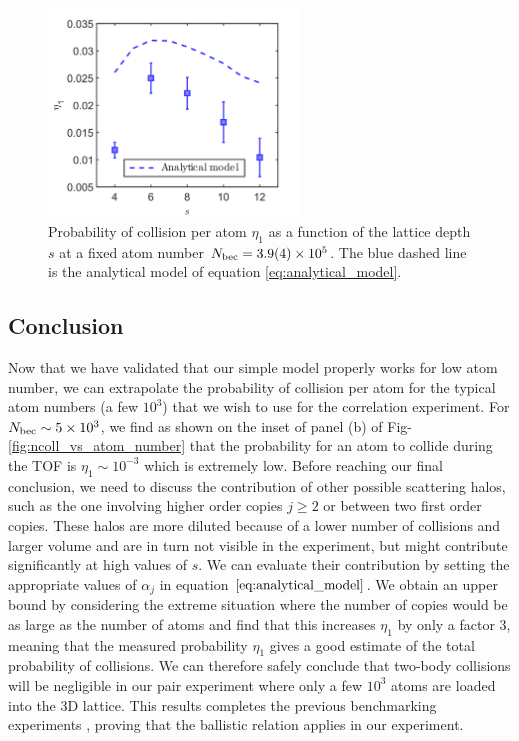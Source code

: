  \begin{figure}
     \centering
     \includegraphics[width=0.6\textwidth]{Fig/Chapter3/ncoll_vs_s.png}
     \caption[Probability of collision per atom as a function of the lattice depth]{Probability of collision per atom $\eta_1$ as a function of the lattice depth $s$ at a fixed atom number $N_{\rm{bec}}=3.9(4) \times 10^5$. The blue dashed line is the analytical model of equation \ref{eq:analytical_model}.}
     \label{fig:ncoll_vs_s}
 \end{figure}

\subsection{Conclusion}

Now that we have validated that our simple model properly works for low atom number, we can extrapolate the probability of collision per atom for the typical atom numbers (a few $10^3$) that we wish to use for the \kmk correlation experiment. For $N_{\rm{bec}} \sim 5 \times 10^3$, we find as shown on the inset of panel (b) of Fig-\ref{fig:ncoll_vs_atom_number} that the probability for an atom to collide during the TOF is $\eta_1 \sim 10^{-3}$ which is extremely low. Before reaching our final conclusion, we need to discuss the contribution of other possible scattering halos, such as the one involving higher order copies $j \geq 2$ or between two first order copies. These halos are more diluted because of a lower number of collisions and larger volume and are in turn not visible in the experiment, but might contribute significantly at high values of $s$. We can evaluate their contribution by setting the appropriate values of $\alpha_j$ in equation $\ref{eq:analytical_model}$. We obtain an upper bound by considering the extreme situation where the number of copies would be as large as the number of atoms and find that this increases $\eta_1$ by only a factor 3, meaning that the measured probability $\eta_1$ gives a good estimate of the total probability of collisions. We can therefore safely conclude that two-body collisions will be negligible in our \kmk pair experiment where only a few $10^3$ atoms are loaded into the 3D lattice. This results completes the previous benchmarking experiments \cite{cayla2018single}, proving that the ballistic relation applies in our experiment.


